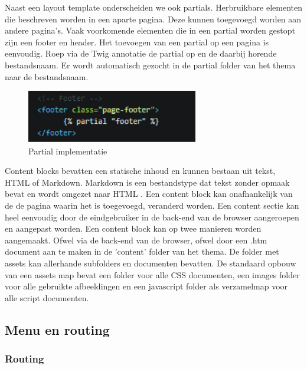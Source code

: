 \noindent
Naast een layout template onderscheiden we ook partials. Herbruikbare elementen die beschreven worden in een aparte pagina. Deze kunnen toegevoegd worden aan andere pagina's. Vaak voorkomende elementen die in een partial worden gestopt zijn een footer en header. Het toevoegen van een partial op een pagina is eenvoudig. Roep via de Twig annotatie de partial op en de daarbij horende bestandsnaam. Er wordt automatisch gezocht in de partial folder van het thema naar de bestandsnaam. 

\begin{figure}[!ht]
  \includegraphics[width=75mm]{img/partial-impl.png}
  \centering
  \caption{Partial implementatie}
  \label{fig:Partial implementatie}
\end{figure}

\noindent
Content blocks bevatten een statische inhoud en kunnen bestaan uit tekst, HTML of Markdown. Markdown is een bestandstype dat tekst zonder opmaak bevat en wordt omgezet naar HTML \citep{GruberJohn2004Markdown}. Een content block kan onafhankelijk van de de pagina waarin het is toegevoegd, veranderd worden. Een content sectie kan heel eenvoudig door de eindgebruiker in de back-end van de browser aangeroepen en aangepast worden. Een content block kan op twee manieren worden aangemaakt. Ofwel via de back-end van de browser, ofwel door een .htm document aan te maken in de 'content' folder van het thema. 
\newline\newline
De folder met assets kan allerhande subfolders en documenten bevatten. De standaard opbouw van een assets map bevat een folder voor alle CSS documenten, een images folder voor alle gebruikte afbeeldingen en een javascript folder als verzamelmap voor alle script documenten.

\subsection{Menu en routing}
\subsubsection{Routing}

